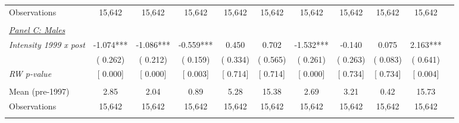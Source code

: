 \begin{tabular}{lcccccccccc}
Observations &       15,642 &       15,642 &       15,642 &       15,642 &       15,642 &       15,642 &       15,642 &       15,642 &       15,642 \\ 
  & & & & & & & & & \\ 
\underline{\textit{Panel C: Males}}  \\ 
\textit{Intensity 1999 x post} &       -1.074*** &       -1.086*** &       -0.559*** &        0.450 &        0.702 &       -1.532*** &       -0.140 &        0.075 &        2.163*** \\ 
 & (       0.262) & (       0.212) & (       0.159) & (       0.334) & (       0.565) & (       0.261) & (       0.263) & (       0.083) & (       0.641) \\ 
\textit{RW p-value} & [ 0.000] & [ 0.000] & [ 0.003] & [ 0.714] & [ 0.714] & [ 0.000] & [ 0.734] & [ 0.734] & [ 0.004] \\ 
  & & & & & & & & & \\ 
Mean (pre-1997) &         2.85 &         2.04 &         0.89 &         5.28 &        15.38 &         2.69 &         3.21 &         0.42 &        15.73 \\ 
Observations &       15,642 &       15,642 &       15,642 &       15,642 &       15,642 &       15,642 &       15,642 &       15,642 &       15,642 \\ 
  & & & & & & & & & \\ 
\bottomrule
\end{tabular}
